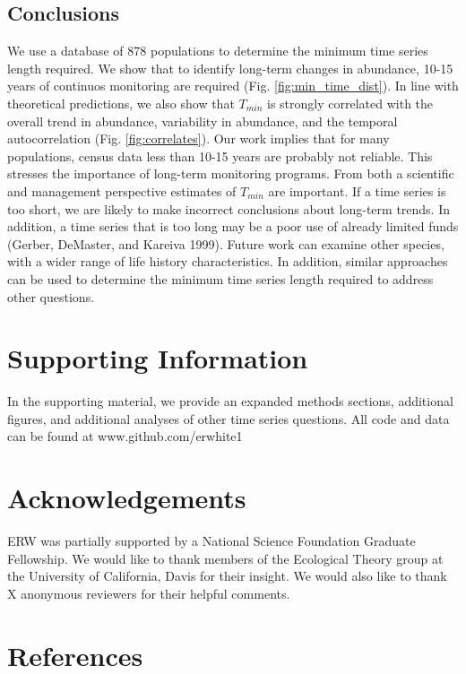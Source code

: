 \documentclass[12pt,]{article}
\begin{document}
\subsection{Conclusions}\label{conclusions}

We use a database of 878 populations to determine the minimum time
series length required. We show that to identify long-term changes in
abundance, 10-15 years of continuos monitoring are required (Fig.
\ref{fig:min_time_dist}). In line with theoretical predictions, we also
show that \(T_{min}\) is strongly correlated with the overall trend in
abundance, variability in abundance, and the temporal autocorrelation
(Fig. \ref{fig:correlates}). Our work implies that for many populations,
census data less than 10-15 years are probably not reliable. This
stresses the importance of long-term monitoring programs. From both a
scientific and management perspective estimates of \(T_{min}\) are
important. If a time series is too short, we are likely to make
incorrect conclusions about long-term trends. In addition, a time series
that is too long may be a poor use of already limited funds (Gerber,
DeMaster, and Kareiva 1999). Future work can examine other species, with
a wider range of life history characteristics. In addition, similar
approaches can be used to determine the minimum time series length
required to address other questions.

\section{Supporting Information}\label{supporting-information}

In the supporting material, we provide an expanded methods sections,
additional figures, and additional analyses of other time series
questions. All code and data can be found at www.github.com/erwhite1

\section{Acknowledgements}\label{acknowledgements}

ERW was partially supported by a National Science Foundation Graduate
Fellowship. We would like to thank members of the Ecological Theory
group at the University of California, Davis for their insight. We would
also like to thank X anonymous reviewers for their helpful comments.

\section{References}\label{references}
\end{document}
